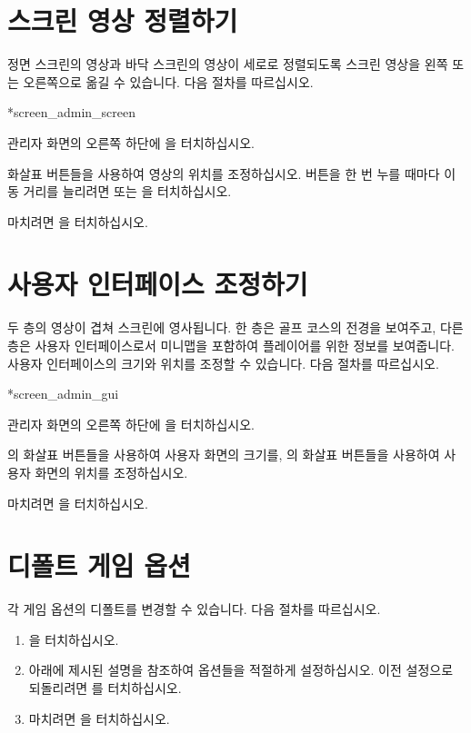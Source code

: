 \documentclass[10pt, openright, language=korean]{hzguide}
\begin{document}
\section{스크린 영상 정렬하기}

정면 스크린의 영상과 바닥 스크린의 영상이 세로로 정렬되도록 스크린 영상을 왼쪽 또는 오른쪽으로 옮길 수 있습니다. 다음 절차를 따르십시오.

\begin{IllustEnum}*{screen_admin_screen}
\item 관리자 화면의 오른쪽 하단에 을 터치하십시오.
\item 화살표 버튼들을 사용하여 영상의 위치를 조정하십시오. 버튼을 한 번 누를 때마다 이동 거리를 늘리려면  또는 을 터치하십시오.
\item 마치려면 을 터치하십시오.
\end{IllustEnum}

\section{사용자 인터페이스 조정하기}

두 층의 영상이 겹쳐 스크린에 영사됩니다.
한 층은 골프 코스의 전경을 보여주고, 다른 층은 사용자 인터페이스로서 미니맵을 포함하여 플레이어를 위한 정보를 보여줍니다.
사용자 인터페이스의 크기와 위치를 조정할 수 있습니다. 다음 절차를 따르십시오.

\begin{IllustEnum}*{screen_admin_gui}
\item 관리자 화면의 오른쪽 하단에 을 터치하십시오.
\item {}의 화살표 버튼들을 사용하여 사용자 화면의 크기를, 의 화살표 버튼들을 사용하여 사용자 화면의 위치를 조정하십시오.
\item 마치려면 을 터치하십시오.
\end{IllustEnum}
    
\section{디폴트 게임 옵션}
\label{sec:admin_setting_default}

각 게임 옵션의 디폴트를 변경할 수 있습니다. 다음 절차를 따르십시오.

\begin{enumerate}
\item {}을 터치하십시오.
\item 아래에 제시된 설명을 참조하여 옵션들을 적절하게 설정하십시오. 이전 설정으로 되돌리려면 를 터치하십시오.
\item 마치려면 을 터치하십시오. 
\end{enumerate}
\end{document}
